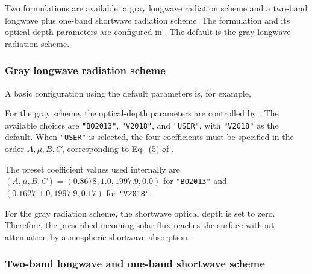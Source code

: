 Two formulations are available: a gray longwave radiation scheme and a two-band longwave plus one-band shortwave radiation scheme.
The formulation and its optical-depth parameters are configured in .  
The default is the gray longwave radiation scheme.


\subsubsection{Gray longwave radiation scheme}
A basic configuration using the default parameters is, for example,

For the gray scheme, the optical-depth parameters are controlled by .
The available choices are \verb|"BO2013"|, \verb|"V2018"|, and \verb|"USER"|, with \verb|"V2018"| as the default.
When \verb|"USER"| is selected, the four coefficients  must be specified in the order $A,\mu,B,C$, 
corresponding to Eq.~(5) of \cite{Vallis2018}.

The preset coefficient values used internally are $(A,\mu,B,C)=(0.8678,1.0,1997.9,0.0)$ for \verb|"BO2013"| and
$(0.1627,1.0,1997.9,0.17)$ for \verb|"V2018"|.

For the gray radiation scheme, the shortwave optical depth is set to zero.
Therefore, the prescribed incoming solar flux reaches the surface without attenuation by atmospheric shortwave absorption.


\subsubsection{Two-band longwave and one-band shortwave scheme}

